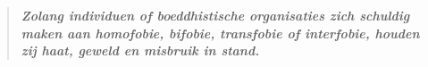 \documentclass[12pt,openany]{book}
\begin{document}
\newpage
\thispagestyle{empty}

\rmfamily

\begin{center}\end{center}
\begin{center}

\vfill
\color{gray}

\vfill

\end{center}

\begin{figure}[h]
    \centering
\end{figure}

\thispagestyle{empty}

\begin{figure}[h]
\end{figure}

\thispagestyle{empty}

\mainmatter
\newpage
\thispagestyle{empty}
\color{darkgray}
\begin{quote}
\doublespacing
\centering
\textit{\Large \textbf{Zolang individuen of boeddhistische organisaties zich schuldig maken aan homofobie, bifobie, transfobie of interfobie, houden zij haat, geweld en misbruik in stand.}}
\end{quote}
\end{document}
